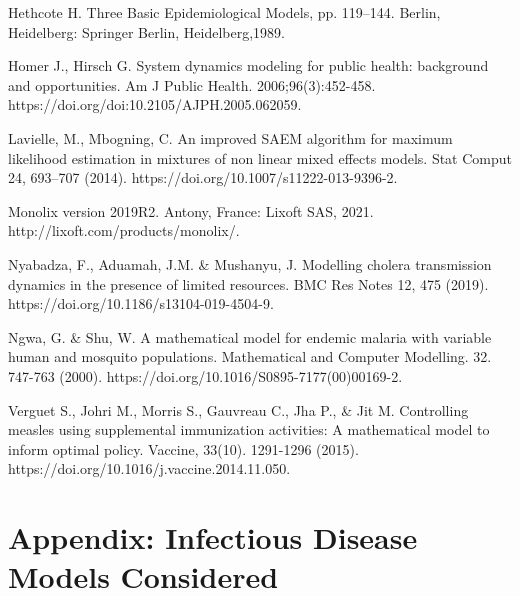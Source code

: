 \documentclass[letter,12pt, usenames,dvipsnames]{article}
\begin{document}
\clearpage

\begin{thebibliography}{alpha}
 Hethcote H. Three Basic Epidemiological Models, pp. 119–144. Berlin, Heidelberg: Springer Berlin, Heidelberg,1989.


Homer J., Hirsch G. System dynamics modeling for public health: background and opportunities. Am J Public Health. 2006;96(3):452-458. https://doi.org/doi:10.2105/AJPH.2005.062059.

 Lavielle, M., Mbogning, C. An improved SAEM algorithm for maximum likelihood estimation in mixtures of non linear mixed effects models. Stat Comput 24, 693–707 (2014). https://doi.org/10.1007/s11222-013-9396-2.

 Monolix version 2019R2. Antony, France: Lixoft SAS, 2021.
http://lixoft.com/products/monolix/.

Nyabadza, F., Aduamah, J.M. \& Mushanyu, J. Modelling cholera transmission dynamics in the presence of limited resources. BMC Res Notes 12, 475 (2019). https://doi.org/10.1186/s13104-019-4504-9.

 Ngwa, G. \& Shu, W. A mathematical model for endemic malaria with variable human and mosquito populations. Mathematical and Computer Modelling. 32. 747-763 (2000). https://doi.org/10.1016/S0895-7177(00)00169-2. 

 Verguet S., Johri M., Morris S., Gauvreau C., Jha P., \& Jit M. Controlling measles using supplemental immunization activities: A mathematical model to inform optimal policy. Vaccine, 33(10). 1291-1296 (2015). https://doi.org/10.1016/j.vaccine.2014.11.050.

\end{thebibliography}

\clearpage

\section{Appendix: Infectious Disease Models Considered}
\label{sec:Appendix}
\end{document}
